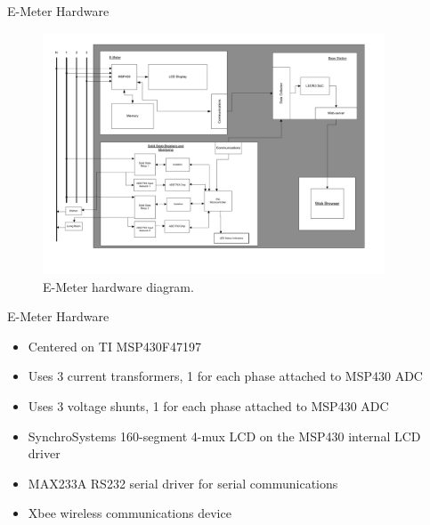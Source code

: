 \documentclass{beamer}
\begin{document}
\begin{frame}{E-Meter Hardware}
	\begin{figure}[htbp]
	\begin{center}
	\includegraphics[width=4in]{includes/e_meter_diagram}
	\caption{E-Meter hardware diagram.}
	\label{fig:e_meter_diagram}
	\end{center}
	\end{figure}
\end{frame}
\begin{frame}{E-Meter Hardware}
	\begin{itemize}
		\item <1 -> Centered on TI MSP430F47197
		\item <2 -> Uses 3 current transformers, 1 for each phase attached to MSP430 ADC
		\item <3 -> Uses 3 voltage shunts, 1 for each phase attached to MSP430 ADC
		\item <4 -> SynchroSystems 160-segment 4-mux LCD on the MSP430 internal LCD driver
		\item <5 -> MAX233A RS232 serial driver for serial communications
		\item <6 -> Xbee wireless communications device
	\end{itemize}
\end{frame}
\end{document}
